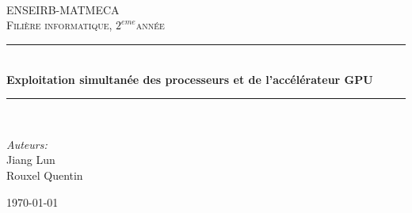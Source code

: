 \documentclass[a4paper,oneside,12pt]{article}
\def\titre{Exploitation simultanée des processeurs et de l'accélérateur GPU}
\def\filiere{informatique}
\def\annee{$2^{eme}$}  %
\def\equipe{Jiang Lun \\ Rouxel Quentin}
\newcommand{\HRule}{\rule{\linewidth}{0.5mm}}
\begin{document}
\begin{titlepage}

\begin{center}

\begin{center}
\end{center}
~\\
~\\
~\\
\textsc{\LARGE ENSEIRB-MATMECA}\\[1cm]

\textsc{\Large {Fili\`ere \filiere, \annee ann\'ee}}\\[0.5cm]

\HRule \\[0.4cm]
{ \huge \bfseries \titre}\\[0.4cm]


\HRule \\[1.5cm]

\begin{minipage}{0.4\textwidth}
\begin{flushleft} \large
\vspace{-1.0cm}
\emph{Auteurs:}\\
\equipe
\vspace{0.5cm}
\end{flushleft}
\end{minipage}
\begin{minipage}{0.4\textwidth}
\begin{flushright} \large
\end{flushright}
\end{minipage}

\vfill

{\large \today}

\end{center}

\end{titlepage}
\end{document}
